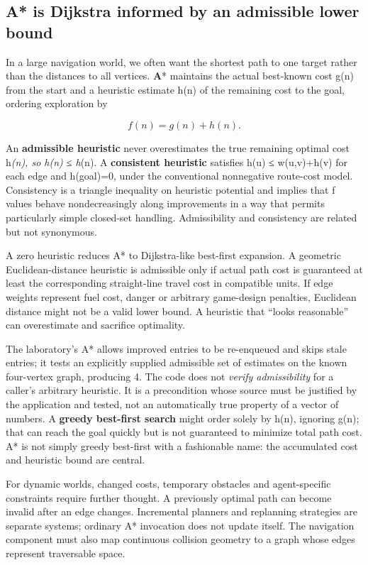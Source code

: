 \subsection{A* is Dijkstra informed by an admissible lower bound}\label{01-foundations-i-ch008-a-is-dijkstra-informed-by-an-admissible-lower-bound}

In a large navigation world, we often want the shortest path to one target rather than the distances to all vertices. \textbf{A}* maintains the actual best-known cost g(n) from the start and a heuristic estimate h(n) of the remaining cost to the goal, ordering exploration by

\[
f(n)=g(n)+h(n).
\]

An \textbf{admissible heuristic} never overestimates the true remaining optimal cost h\emph{(n), so h(n) ≤ h}(n). A \textbf{consistent heuristic} satisfies h(u) ≤ w(u,v)+h(v) for each edge and h(goal)=0, under the conventional nonnegative route-cost model. Consistency is a triangle inequality on heuristic potential and implies that f values behave nondecreasingly along improvements in a way that permits particularly simple closed-set handling. Admissibility and consistency are related but not synonymous.

A zero heuristic reduces A* to Dijkstra-like best-first expansion. A geometric Euclidean-distance heuristic is admissible only if actual path cost is guaranteed at least the corresponding straight-line travel cost in compatible units. If edge weights represent fuel cost, danger or arbitrary game-design penalties, Euclidean distance might not be a valid lower bound. A heuristic that ``looks reasonable'' can overestimate and sacrifice optimality.

The laboratory's A* allows improved entries to be re-enqueued and skips stale entries; it tests an explicitly supplied admissible set of estimates on the known four-vertex graph, producing 4. The code does not \emph{verify admissibility} for a caller's arbitrary heuristic. It is a precondition whose source must be justified by the application and tested, not an automatically true property of a vector of numbers. A \textbf{greedy best-first search} might order solely by h(n), ignoring g(n); that can reach the goal quickly but is not guaranteed to minimize total path cost. A* is not simply greedy best-first with a fashionable name: the accumulated cost and heuristic bound are central.

For dynamic worlds, changed costs, temporary obstacles and agent-specific constraints require further thought. A previously optimal path can become invalid after an edge changes. Incremental planners and replanning strategies are separate systems; ordinary A* invocation does not update itself. The navigation component must also map continuous collision geometry to a graph whose edges represent traversable space.

